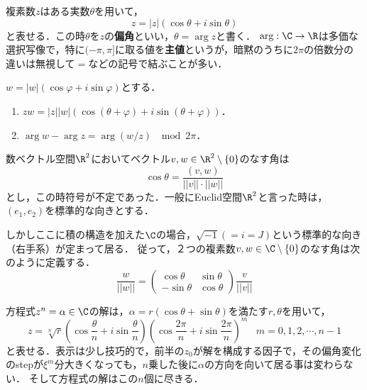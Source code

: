 \documentclass[uplatex, dvipdfmx]{jsreport}
\begin{document}
\begin{definition}
    複素数$z$はある実数$\theta$を用いて，
    \[ z=|z|(\cos\theta+i\sin\theta) \]
    と表せる．この時$\theta$を$z$の\textbf{偏角}といい，$\theta=\arg z$と書く．
    $\arg:\C\to\R$は多価な選択写像で，特に$(-\pi,\pi]$に取る値を\textbf{主値}というが，暗黙のうちに$2\pi$の倍数分の違いは無視して$=$などの記号で結ぶことが多い．
\end{definition}
\begin{lemma}
    $w=|w|(\cos\varphi+i\sin\varphi)$とする．
    \begin{enumerate}
        \item $zw=|z||w|(\cos(\theta+\varphi)+i\sin(\theta+\varphi))$．
        \item $\arg w-\arg z=\arg(w/z)\; \mod 2\pi$．
    \end{enumerate}
\end{lemma}
\begin{definition}[Gauss平面の向きと複素数のなす角]
    数ベクトル空間$\R^2$においてベクトル$v,w\in\R^2\setminus\{0\}$のなす角は
    \[ \cos\theta=\frac{(v,w)}{||v||\cdot ||w||} \]
    とし，この時符号が不定であった．一般にEuclid空間$\R^2$と言った時は，$(e_1,e_2)$を標準的な向きとする．

    しかしここに積の構造を加えた$\C$の場合，$\sqrt{-1}(=i=J)$という標準的な向き（右手系）が定まって居る．
    従って，２つの複素数$v,w\in\C\setminus\{0\}$のなす角は次のように定義する．
    \[ \frac{w}{||w||}=\begin{pmatrix}\cos\theta&\sin\theta\\-\sin\theta&\cos\theta\end{pmatrix}\frac{v}{||v||} \]
\end{definition}

\begin{proposition}[円分方程式の解]
    方程式$z^n=\alpha\in\C$の解は，$\alpha=r(\cos\theta+\sin\theta)$を満たす$r,\theta$を用いて，
    \[ z=\sqrt[n]{r}\left(\cos\frac{\theta}{n}+i\sin\frac{\theta}{n}\right)\left(\cos\frac{2\pi}{n}+i\sin\frac{2\pi}{n}\right)^m\;\;\;m=0,1,2,\cdots,n-1 \]
    と表せる．表示は少し技巧的で，前半の$z_0$が解を構成する因子で，その偏角変化のstepが$\xi^m$分大きくなっても，$n$乗した後に$\alpha$の方向を向いて居る事は変わらない．
    そして方程式の解はこの$n$個に尽きる．
\end{proposition}
\end{document}
